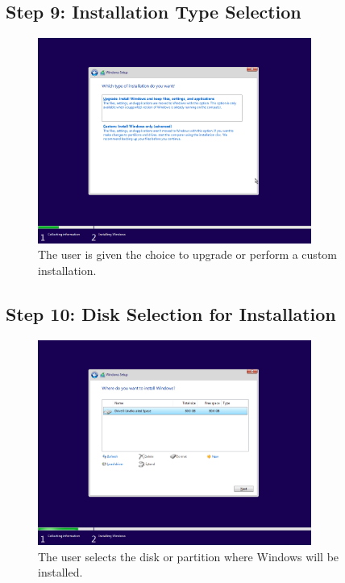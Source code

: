 \documentclass{article}
\begin{document}
\subsection{Step 9: Installation Type Selection}
\begin{figure}[H]
    \centering
    \includegraphics[width=0.8\textwidth]{2024-09-17_13-53-22.png}
    \caption{The user is given the choice to upgrade or perform a custom installation.}
\end{figure}

\subsection{Step 10: Disk Selection for Installation}
\begin{figure}[H]
    \centering
    \includegraphics[width=0.8\textwidth]{2024-09-17_13-53-51.png}
    \caption{The user selects the disk or partition where Windows will be installed.}
\end{figure}
\end{document}
